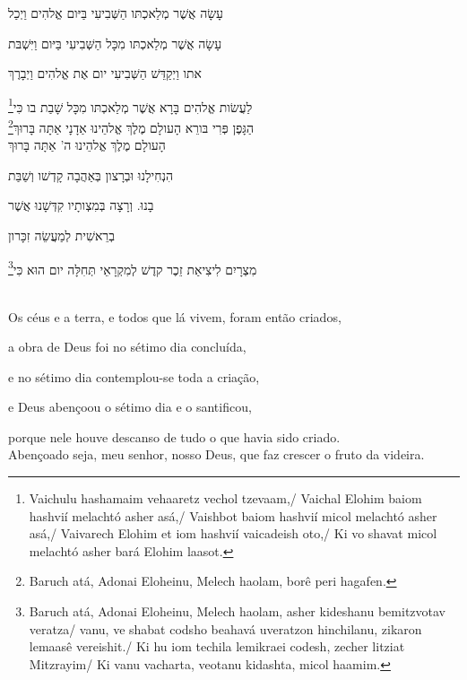 עָשָׂה אֲשֶׁר מְלַאכְתּו הַשְּׁבִיעִי בַּיּום אֱלהִים וַיְכַל 

עָשָׂה אֲשֶׁר מְלַאכְתּו מִכָּל הַשְּׁבִיעִי בַּיּום וַיִּשְׁבּת 

אתו וַיְקַדֵּשׁ הַשְּׁבִיעִי יום אֶת אֱלהִים וַיְבָרֶךְ 

לַעֲשׂות אֱלהִים בָּרָא אֲשֶׁר מְלַאכְתּו מִכָּל שָׁבַת בו כִּי\footnote{Vaichulu hashamaim vehaaretz vechol tzevaam,/
Vaichal Elohim baiom hashvií melachtó asher asá,/
Vaishbot baiom hashvií micol melachtó asher asá,/
Vaivarech Elohim et iom hashvií vaicadeish oto,/
Ki vo shavat micol melachtó asher bará Elohim laasot.}\\[10pt] 

הַגָּפֶן פְּרִי בּורֵא הָעולָם מֶלֶךְ אֱלהֵינוּ אַדָנָי אַתָּה בָּרוּךְ\footnote{Baruch atá, Adonai Eloheinu, Melech haolam, borê peri hagafen.}\\[10pt] 

הָעולָם מֶלֶךְ אֱלהֵינוּ ה' אַתָּה בָּרוּךְ

הִנְחִילָנוּ וּבְרָצון בְּאַהֲבָה קָדְשׁו וְשַׁבַּת

בָנוּ. וְרָצָה בְּמִצְותָיו קִדְּשָׁנוּ אֲשֶׁר

בְרֵאשִׁית לְמַעֲשֵׂה זִכָּרון

מִצְרָיִם לִיצִיאַת זֵכֶר קדֶשׁ לְמִקְרָאֵי תְּחִלָּה יום הוּא כִּי\footnote{Baruch atá, Adonai Eloheinu, Melech haolam, asher kideshanu bemitzvotav veratza/
vanu, ve shabat codsho beahavá uveratzon hinchilanu, zikaron lemaasê vereishit./
Ki hu iom techila lemikraei codesh, zecher litziat Mitzrayim/ Ki vanu vacharta, veotanu kidashta, micol haamim.}\\[10pt]


\movetooddpage
\raggedright

\vspace*{1cm}

\textsc{}\\[15pt]

Os céus e a terra, e todos que lá vivem, foram então criados,

a obra de Deus foi no sétimo dia concluída,

e no sétimo dia contemplou-se toda a criação,

e Deus abençoou o sétimo dia e o santificou,

porque nele houve descanso \qb{}de tudo o que havia sido criado.\\[10pt]

Abençoado seja, meu senhor, nosso Deus, que faz crescer o \qb{}fruto da videira.\\[10pt]

